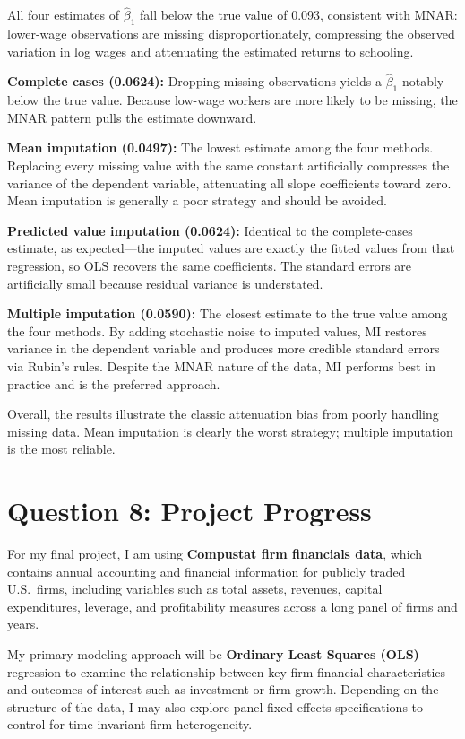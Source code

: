 \documentclass[12pt]{article}
\begin{document}
All four estimates of $\hat{\beta}_1$ fall below the true value of 0.093,
consistent with MNAR: lower-wage observations are missing
disproportionately, compressing the observed variation in log wages and
attenuating the estimated returns to schooling.

\textbf{Complete cases (0.0624):} Dropping missing observations yields a
$\hat{\beta}_1$ notably below the true value. Because low-wage workers are
more likely to be missing, the MNAR pattern pulls the estimate downward.

\textbf{Mean imputation (0.0497):} The lowest estimate among the four
methods. Replacing every missing value with the same constant artificially
compresses the variance of the dependent variable, attenuating all slope
coefficients toward zero. Mean imputation is generally a poor strategy
and should be avoided.

\textbf{Predicted value imputation (0.0624):} Identical to the
complete-cases estimate, as expected---the imputed values are exactly the
fitted values from that regression, so OLS recovers the same coefficients.
The standard errors are artificially small because residual variance is
understated.

\textbf{Multiple imputation (0.0590):} The closest estimate to the true
value among the four methods. By adding stochastic noise to imputed
values, MI restores variance in the dependent variable and produces more
credible standard errors via Rubin's rules. Despite the MNAR nature of
the data, MI performs best in practice and is the preferred approach.

Overall, the results illustrate the classic attenuation bias from poorly
handling missing data. Mean imputation is clearly the worst strategy;
multiple imputation is the most reliable.

\section*{Question 8: Project Progress}

For my final project, I am using \textbf{Compustat firm financials data},
which contains annual accounting and financial information for publicly
traded U.S.\ firms, including variables such as total assets, revenues,
capital expenditures, leverage, and profitability measures across a long
panel of firms and years.

My primary modeling approach will be \textbf{Ordinary Least Squares
(OLS)} regression to examine the relationship between key firm financial
characteristics and outcomes of interest such as investment or firm
growth. Depending on the structure of the data, I may also explore panel
fixed effects specifications to control for time-invariant firm
heterogeneity.
\end{document}
